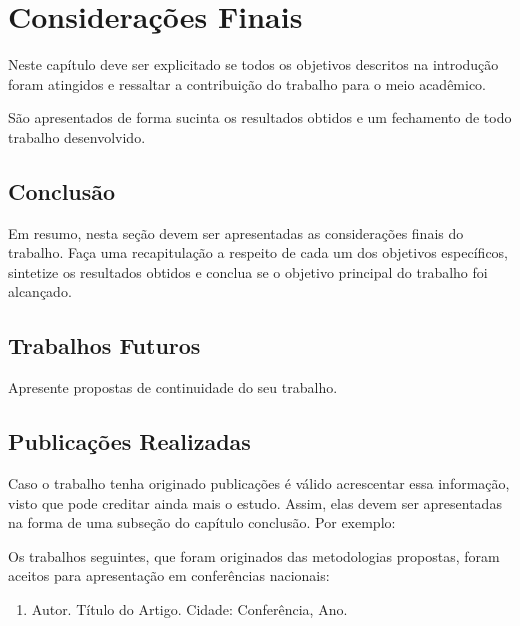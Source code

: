 \chapter{Considerações Finais} \label{consideracoes}

Neste capítulo deve ser explicitado se todos os objetivos descritos na introdução foram atingidos e ressaltar a contribuição do trabalho para o meio acadêmico.

São apresentados de forma sucinta os resultados obtidos e um fechamento de todo trabalho desenvolvido.



\section{Conclusão}\label{conclusao}

Em resumo, nesta seção devem ser apresentadas as considerações finais do trabalho. Faça uma recapitulação a respeito de cada um dos objetivos específicos, sintetize os resultados obtidos e conclua se o objetivo principal do trabalho foi alcançado.


\section{Trabalhos Futuros}\label{trabalhosFuturos}

Apresente propostas de continuidade do seu trabalho.

\section{Publicações Realizadas}\label{publicacoes}

Caso o trabalho tenha originado publicações é válido acrescentar essa informação, visto que pode creditar ainda mais o estudo. Assim, elas devem ser apresentadas na forma de uma subseção do capítulo conclusão. Por exemplo: 

Os trabalhos seguintes, que foram originados das metodologias propostas, foram aceitos para apresentação em conferências nacionais:

\begin{enumerate}
   \item Autor. Título do Artigo. Cidade: Conferência, Ano.
 \end{enumerate}

